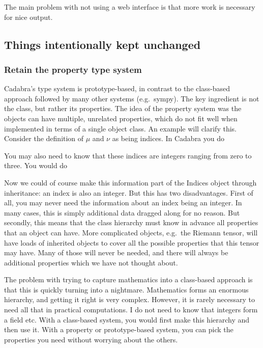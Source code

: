 \documentclass[11pt]{article}
\begin{document}
The main problem with not using a web interface is that more work is
necessary for nice output. 

\subsection{Things intentionally kept unchanged}
\subsubsection{Retain the property type system}

Cadabra's type system is prototype-based, in contrast to the
class-based approach followed by many other systems (e.g.~sympy). 
The key ingredient is not the class, but rather its properties.
The idea of the property system was the objects can have multiple,
unrelated properties, which do not fit well when implemented in terms
of a single object class. An example will clarify this. Consider the
definition of $\mu$ and $\nu$ as being indices. In Cadabra you do
\begin{quote}
\end{quote}
You may also need to know that these indices are integers ranging from
zero to three. You would do
\begin{quote}
\end{quote}
Now we could of course make this information part of the Indices
object through inheritance: an index is also an integer. But this has
two disadvantages. First of all, you may never need the information
about an index being an integer. In many cases, this is simply
additional data dragged along for no reason. But secondly, this means
that the class hierarchy must know in advance all properties that an
object can have. More complicated objects, e.g.~the Riemann tensor,
will have loads of inherited objects to cover all the possible
properties that this tensor may have. Many of those will never be
needed, and there will always be additional properties which we have
not thought about. 

The problem with trying to capture mathematics into a class-based
approach is that this is quickly turning into a nightmare. Mathematics
forms an enormous hierarchy, and getting it right is very
complex. However, it is rarely necessary to need all that in practical
computations. I do not need to know that integers form a field
etc. With a class-based system, you would first make this hierarchy
and then use it. With a property or prototype-based system, you can
pick the properties you need without worrying about the others.
\end{document}
